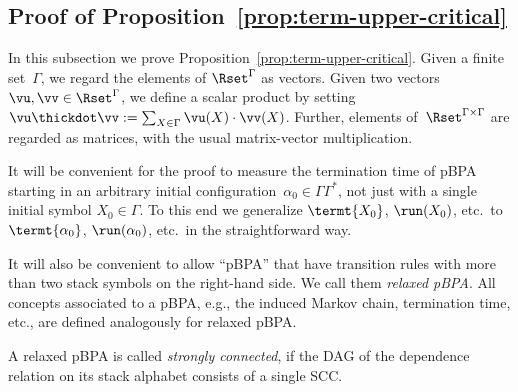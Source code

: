 \subsection{Proof of Proposition~\ref{prop:term-upper-critical}} \label{app:term-upper-critical}

In this subsection we prove Proposition~\ref{prop:term-upper-critical}.
Given a finite set~$\Gamma$, we regard the elements of $\Rset^\Gamma$ as vectors.
Given two vectors $\vu, \vv \in \Rset^\Gamma$, we define a scalar product by setting $\vu \thickdot \vv := \sum_{X \in \Gamma} \vu(X) \cdot \vv(X)$.
Further, elements of~$\Rset^{\Gamma \times \Gamma}$ are regarded as matrices, with the usual matrix-vector multiplication.

It will be convenient for the proof to measure the termination time of pBPA starting in an arbitrary initial configuration~$\alpha_0 \in \Gamma\Gamma^*$,
 not just with a single initial symbol $X_0 \in \Gamma$.
To this end we generalize $\termt{X_0}$, $\run(X_0)$, etc.\ to $\termt{\alpha_0}$, $\run(\alpha_0)$, etc.\ in the straightforward way.

It will also be convenient to allow ``pBPA'' that have transition rules with more than two stack symbols on the right-hand side.
We call them {\em relaxed pBPA}.
All concepts associated to a pBPA, e.g., the induced Markov chain, termination time, etc., are defined analogously for relaxed pBPA.

A relaxed pBPA is called {\em strongly connected}, if the DAG of the dependence relation on its stack alphabet consists of a single SCC.

